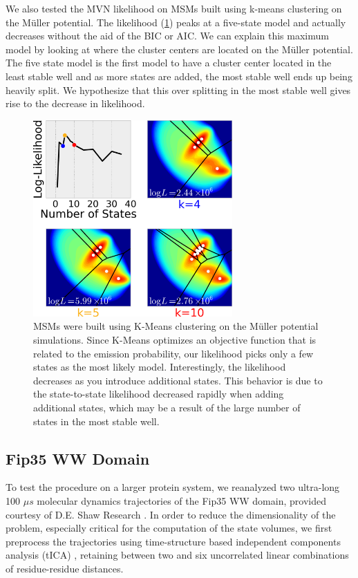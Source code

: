 \documentclass[twocolumn,floatfix,nofootinbib,aps]{revtex4-1}
\begin{document}
We also tested the MVN likelihood on MSMs built using k-means clustering on the M\"uller potential. The likelihood (\cref{fig:kmeans_mull}) peaks at a five-state model and actually decreases without the aid of the BIC or AIC. We can explain this maximum model by looking at where the cluster centers are located on the M\"uller potential. The five state model is the first model to have a cluster center located in the least stable well and as more states are added, the most stable well ends up being heavily split. We hypothesize that this over splitting in the most stable well gives rise to the decrease in likelihood.

\begin{figure}
\centering
\includegraphics[width=3in]{figs/kmeans_vor_like.png}
\caption{MSMs were built using K-Means clustering on the M\"uller potential simulations. Since K-Means optimizes an objective function that is related to the emission probability, our likelihood picks only a few states as the most likely model. Interestingly, the likelihood decreases as you introduce additional states. This behavior is due to the state-to-state likelihood decreased rapidly when adding additional states, which may be a result of the large number of states in the most stable well.}
\label{fig:kmeans_mull}
\end{figure}

\subsection{Fip35 WW Domain}

To test the procedure on a larger protein system, we reanalyzed two ultra-long 100 $\mu s$ molecular dynamics trajectories of the Fip35 WW domain\cite{Liu2008Experimental}, provided courtesy of D.E. Shaw Research \cite{Shaw2010Atomic}. In order to reduce the dimensionality of the problem, especially critical for the computation of the state volumes, we first preprocess the trajectories using time-structure based independent components analysis (tICA) \cite{Schwantes2013Improvements}, retaining between two and six uncorrelated linear combinations of residue-residue distances.
\end{document}
